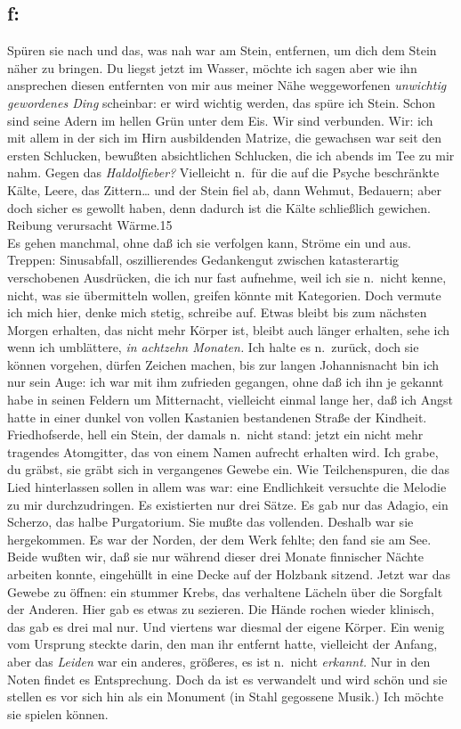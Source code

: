 \documentclass[
]{article}
\author{}
\date{\vspace{-2.5em}}
\begin{document}
\subsection{f:}\label{f}

Spüren sie nach und das, was nah war am Stein, entfernen, um dich dem
Stein näher zu bringen. Du liegst jetzt im Wasser, möchte ich sagen aber
wie ihn ansprechen diesen entfernten von mir aus meiner Nähe
weggeworfenen \emph{unwichtig gewordenes Ding} scheinbar: er wird
wichtig werden, das spüre ich Stein. Schon sind seine Adern im hellen
Grün unter dem Eis. Wir sind verbunden. Wir: ich mit allem in der sich
im Hirn ausbildenden Matrize, die gewachsen war seit den ersten
Schlucken, bewußten absichtlichen Schlucken, die ich abends im Tee zu
mir nahm. Gegen das \emph{Haldolfieber? }Vielleicht n.~für die auf die
Psyche beschränkte Kälte, Leere, das Zittern\ldots{} und der Stein fiel
ab, dann Wehmut, Bedauern; aber doch sicher es gewollt haben, denn
dadurch ist die Kälte schließlich gewichen. Reibung verursacht
Wärme.15\\
Es gehen manchmal, ohne daß ich sie verfolgen kann, Ströme ein und aus.
Treppen: Sinusabfall, oszillierendes Gedankengut zwischen katasterartig
verschobenen Ausdrücken, die ich nur fast aufnehme, weil ich sie
n.~nicht kenne, nicht, was sie übermitteln wollen, greifen könnte mit
Kategorien. Doch vermute ich mich hier, denke mich stetig, schreibe auf.
Etwas bleibt bis zum nächsten Morgen erhalten, das nicht mehr Körper
ist, bleibt auch länger erhalten, sehe ich wenn ich umblättere, \emph{in
achtzehn Monaten.} Ich halte es n.~zurück, doch sie können vorgehen,
dürfen Zeichen machen, bis zur langen Johannisnacht bin ich nur sein
Auge: ich war mit ihm zufrieden gegangen, ohne daß ich ihn je gekannt
habe in seinen Feldern um Mitternacht, vielleicht einmal lange her, daß
ich Angst hatte in einer dunkel von vollen Kastanien bestandenen Straße
der Kindheit. Friedhofserde, hell ein Stein, der damals n.~nicht stand:
jetzt ein nicht mehr tragendes Atomgitter, das von einem Namen aufrecht
erhalten wird. Ich grabe, du gräbst, sie gräbt sich in vergangenes
Gewebe ein. Wie Teilchenspuren, die das Lied hinterlassen sollen in
allem was war: eine Endlichkeit versuchte die Melodie zu mir
durchzudringen. Es existierten nur drei Sätze. Es gab nur das Adagio,
ein Scherzo, das halbe Purgatorium. Sie mußte das vollenden. Deshalb war
sie hergekommen. Es war der Norden, der dem Werk fehlte; den fand sie am
See. Beide wußten wir, daß sie nur während dieser drei Monate finnischer
Nächte arbeiten konnte, eingehüllt in eine Decke auf der Holzbank
sitzend. Jetzt war das Gewebe zu öffnen: ein stummer Krebs, das
verhaltene Lächeln über die Sorgfalt der Anderen. Hier gab es etwas zu
sezieren. Die Hände rochen wieder klinisch, das gab es drei mal nur. Und
viertens war diesmal der eigene Körper. Ein wenig vom Ursprung steckte
darin, den man ihr entfernt hatte, vielleicht der Anfang, aber das
\emph{Leiden} war ein anderes, größeres, es ist n.~nicht \emph{erkannt.
}Nur in den Noten findet es Entsprechung. Doch da ist es verwandelt und
wird schön und sie stellen es vor sich hin als ein Monument (in Stahl
gegossene Musik.) Ich möchte sie spielen können.
\end{document}
